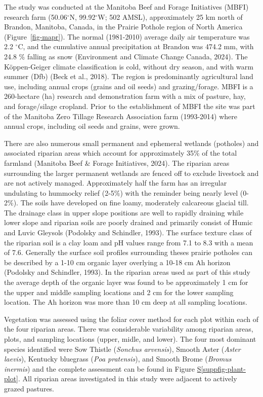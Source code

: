 \documentclass[
]{agujournal2019}
\newcommand*\quartosuppfigref[1]{Figure \hyperref[#1]{S\ref{#1}}}
\begin{document}
The study was conducted at the Manitoba Beef and Forage Initiatives
(MBFI) research farm (50.06\(^\circ\)N, 99.92\(^\circ\)W; 502 AMSL),
approximately 25 km north of Brandon, Manitoba, Canada, in the Prairie
Pothole region of North America (Figure~\ref{fig-mapr}). The normal
(1981-2010) average daily air temperature was 2.2 \(^\circ\)C, and the
cumulative annual precipitation at Brandon was 474.2 mm, with 24.8 \%
falling as snow (Environment and Climate Change Canada, 2024). The
Köppen-Geiger climate classification is cold, without dry season, and
with warm summer (Dfb) (Beck et al., 2018). The region is predominantly
agricultural land use, including annual crops (grains and oil seeds) and
grazing/forage. MBFI is a 260-hectare (ha) research and demonstration
farm with a mix of pasture, hay, and forage/silage cropland. Prior to
the establishment of MBFI the site was part of the Manitoba Zero Tillage
Research Association farm (1993-2014) where annual crops, including oil
seeds and grains, were grown.

There are also numerous small permanent and ephemeral wetlands
(potholes) and associated riparian areas which account for approximately
35\% of the total farmland (Manitoba Beef \& Forage Initiatives, 2024).
The riparian areas surrounding the larger permanent wetlands are fenced
off to exclude livestock and are not actively managed. Approximately
half the farm has an irregular undulating to hummocky relief (2-5\%)
with the reminder being nearly level (0-2\%). The soils have developed
on fine loamy, moderately calcareous glacial till. The drainage class in
upper slope positions are well to rapidly draining while lower slope and
riparian soils are poorly drained and primarily consist of Humic and
Luvic Gleysols (Podolsky and Schindler, 1993). The surface texture class
of the riparian soil is a clay loam and pH values range from 7.1 to 8.3
with a mean of 7.6. Generally the surface soil profiles surrounding
theses prairie potholes can be described by a 1-10 cm organic layer
overlying a 10-18 cm Ah horizon (Podolsky and Schindler, 1993). In the
riparian areas used as part of this study the average depth of the
organic layer was found to be approximately 1 cm for the upper and
middle sampling locations and 2 cm for the lower sampling location. The
Ah horizon was more than 10 cm deep at all sampling locations.

Vegetation was assessed using the foliar cover method for each plot
within each of the four riparian areas. There was considerable
variability among riparian areas, plots, and sampling locations (upper,
midle, and lower). The four most dominant species identified were Sow
Thistle (\emph{Sonchus arvensis}), Smooth Aster (\emph{Aster laevis}),
Kentucky bluegrass (\emph{Poa pratensis}), and Smooth Brome
(\emph{Bromus inermis}) and the complete assessment can be found in
\quartosuppfigref{suppfig-plant-plot}. All riparian areas investigated
in this study were adjacent to actively grazed pastures.
\end{document}
